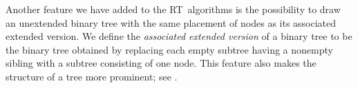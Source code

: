 Another feature we have added to the RT~algorithms is the possibility to draw
an unextended binary tree with the same placement of nodes as its
associated extended version. We define the \emph{associated extended version}
of a binary tree to be the binary tree obtained by replacing each empty subtree
having a nonempty sibling with a subtree consisting of one node. This feature
also makes the structure of a tree more prominent; see .


